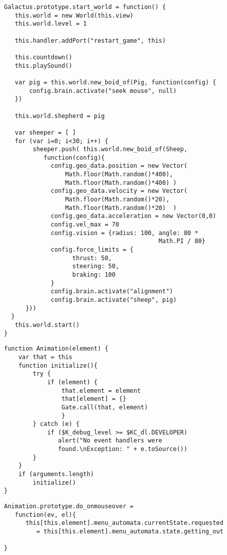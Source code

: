 \begin{lstlisting}[caption=Función start\_world, label={lst:code451}]
Galactus.prototype.start_world = function() {
   this.world = new World(this.view)
   this.world.level = 1

   this.handler.addPort("restart_game", this)
   
   this.countdown()
   this.playSound()

   var pig = this.world.new_boid_of(Pig, function(config) {
       config.brain.activate("seek mouse", null)
   })

   this.world.shepherd = pig

   var sheeper = [ ]
   for (var i=0; i<30; i++) {
        sheeper.push( this.world.new_boid_of(Sheep, 
           function(config){
             config.geo_data.position = new Vector(
                 Math.floor(Math.random()*400), 
                 Math.floor(Math.random()*400) )
             config.geo_data.velocity = new Vector(
                 Math.floor(Math.random()*20), 
                 Math.floor(Math.random()*20)  )
             config.geo_data.acceleration = new Vector(0,0)
             config.vel_max = 70
             config.vision = {radius: 100, angle: 80 * 
                                           Math.PI / 80}           
             config.force_limits = {
                   thrust: 50,
                   steering: 50,
                   braking: 100
             }
             config.brain.activate("alignment")
             config.brain.activate("sheep", pig)
      }))
  }
   this.world.start()
}
\end{lstlisting}


\begin{lstlisting}[caption=Constructor Animation, label={lst:code5121}]
function Animation(element) {
    var that = this
    function initialize(){
        try {
            if (element) {
                that.element = element
                that[element] = {}
                Gate.call(that, element)                      
                }
        } catch (e) {
            if ($K_debug_level >= $KC_dl.DEVELOPER)
               alert("No event handlers were 
               found.\nException: " + e.toSource())
        }
    }
    if (arguments.length)
        initialize()
}
\end{lstlisting}


\begin{lstlisting}[caption=Clase Button, label={lst:code5122}]
Animation.prototype.do_onmouseover = 
   function(ev, el){
      this[this.element].menu_automata.currentState.requested 
         = this[this.element].menu_automata.state.getting_out

}
\end{lstlisting}


